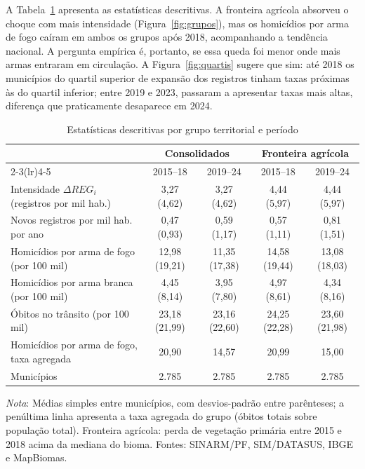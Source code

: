 \documentclass[11pt,a4paper]{article}
\newcommand{\nota}[1]{\par\vspace{2pt}\begin{minipage}{\linewidth}\footnotesize\textit{Nota}: #1\end{minipage}}
\begin{document}
A Tabela~\ref{tab:desc} apresenta as estatísticas descritivas. A fronteira agrícola absorveu o choque com mais intensidade (Figura~\ref{fig:grupos}), mas os homicídios por arma de fogo caíram em ambos os grupos após 2018, acompanhando a tendência nacional. A pergunta empírica é, portanto, se essa queda foi menor onde mais armas entraram em circulação. A Figura~\ref{fig:quartis} sugere que sim: até 2018 os municípios do quartil superior de expansão dos registros tinham taxas próximas às do quartil inferior; entre 2019 e 2023, passaram a apresentar taxas mais altas, diferença que praticamente desaparece em 2024.

\begin{table}[H]
\centering\footnotesize\setlength{\tabcolsep}{4pt}
\caption{Estatísticas descritivas por grupo territorial e período}\label{tab:desc}
\begin{tabular}{lcccc}
\toprule
 & \multicolumn{2}{c}{Consolidados} & \multicolumn{2}{c}{Fronteira agrícola} \\
\cmidrule(lr){2-3}\cmidrule(lr){4-5}
 & 2015--18 & 2019--24 & 2015--18 & 2019--24 \\
\midrule
Intensidade $\Delta REG_i$ (registros por mil hab.) & 3{,}27 (4{,}62) & 3{,}27 (4{,}62) & 4{,}44 (5{,}97) & 4{,}44 (5{,}97) \\
Novos registros por mil hab. por ano & 0{,}47 (0{,}93) & 0{,}59 (1{,}17) & 0{,}57 (1{,}11) & 0{,}81 (1{,}51) \\
Homicídios por arma de fogo (por 100 mil) & 12{,}98 (19{,}21) & 11{,}35 (17{,}38) & 14{,}58 (19{,}44) & 13{,}08 (18{,}03) \\
Homicídios por arma branca (por 100 mil) & 4{,}45 (8{,}14) & 3{,}95 (7{,}80) & 4{,}97 (8{,}61) & 4{,}34 (8{,}16) \\
Óbitos no trânsito (por 100 mil) & 23{,}18 (21{,}99) & 23{,}16 (22{,}60) & 24{,}25 (22{,}28) & 23{,}60 (21{,}98) \\
Homicídios por arma de fogo, taxa agregada & 20{,}90 & 14{,}57 & 20{,}99 & 15{,}00 \\
Municípios & 2.785 & 2.785 & 2.785 & 2.785 \\
\bottomrule
\end{tabular}
\nota{Médias simples entre municípios, com desvios-padrão entre parênteses; a penúltima linha apresenta a taxa agregada do grupo (óbitos totais sobre população total). Fronteira agrícola: perda de vegetação primária entre 2015 e 2018 acima da mediana do bioma. Fontes: SINARM/PF, SIM/DATASUS, IBGE e MapBiomas.}
\end{table}
\end{document}
